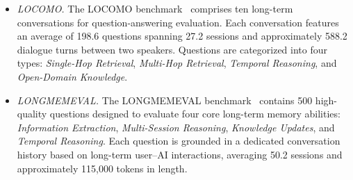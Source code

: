 \begin{itemize}[topsep=1mm, partopsep=0pt, itemsep=0pt, leftmargin=10pt]
\item \textit{LOCOMO.} 
The LOCOMO benchmark~\cite{maharana2024locomo} comprises ten long-term conversations for question-answering evaluation. Each conversation features an average of 198.6 questions spanning 27.2 sessions and approximately 588.2 dialogue turns between two speakers. Questions are categorized into four types: \emph{Single-Hop Retrieval}, \emph{Multi-Hop Retrieval}, \emph{Temporal Reasoning}, and \emph{Open-Domain Knowledge}.



\item \textit{LONGMEMEVAL.} 
The LONGMEMEVAL benchmark~\cite{wu2025longmemeval} contains 500 high-quality questions designed to evaluate four core long-term memory abilities: \emph{Information Extraction}, \emph{Multi-Session Reasoning}, \emph{Knowledge Updates}, and \emph{Temporal Reasoning}. Each question is grounded in a dedicated conversation history based on long-term user--AI interactions, averaging 50.2 sessions and approximately 115,000 tokens in length.

\end{itemize}





